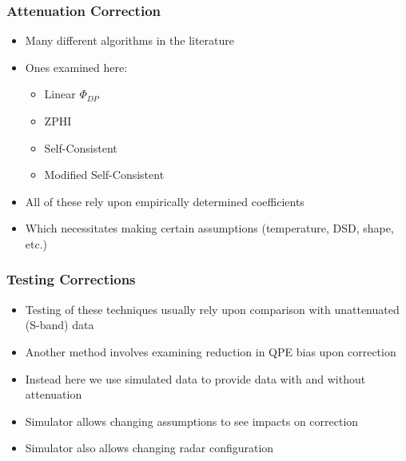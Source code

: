 \documentclass[red]{beamer}
\begin{document}
\begin{frame}
	\frametitle{Attenuation Correction}
	\begin{itemize}[<+->]
		\item Many different algorithms in the literature
		\item Ones examined here:
		\begin{itemize}
			\item Linear $\Phi_{DP}$
			\item ZPHI
			\item Self-Consistent
			\item Modified Self-Consistent
		\end{itemize}
		\item All of these rely upon empirically determined coefficients
		\item Which necessitates making certain assumptions (temperature,
		DSD, shape, etc.)
	\end{itemize}
\end{frame}
\begin{frame}[<+->]
	\frametitle{Testing Corrections}
	\begin{itemize}	
		\item Testing of these techniques usually rely upon comparison with
		unattenuated (S-band) data
		\item Another method involves examining reduction in QPE bias upon correction
		\item Instead here we use simulated data to provide data with and without
		attenuation
		\item Simulator allows changing assumptions to see impacts on correction
		\item Simulator also allows changing radar configuration
	\end{itemize}
\end{frame}
\end{document}
